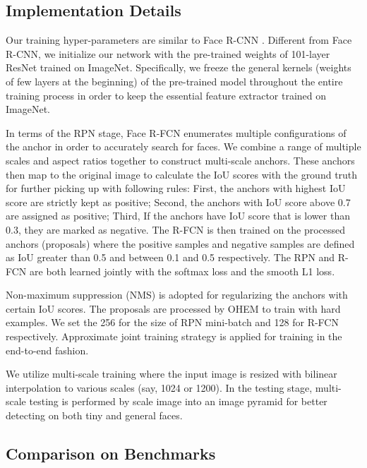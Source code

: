 \documentclass{article} \usepackage{nips13submit_e,times}
\begin{document}
\subsection{Implementation Details}
Our training hyper-parameters are similar to Face R-CNN \cite{facercnn}. Different from Face R-CNN, we initialize our network with the pre-trained weights of 101-layer ResNet trained on ImageNet. Specifically, we freeze the general kernels (weights of few layers at the beginning) of the pre-trained model throughout the entire training process in order to keep the essential feature extractor trained on ImageNet. 

In terms of the RPN stage, Face R-FCN enumerates multiple configurations of the anchor in order to accurately search for faces. We combine a range of multiple scales and aspect ratios together to construct multi-scale anchors. These anchors then map to the original image to calculate the IoU scores with the ground truth for further picking up with following rules: First, the anchors with highest IoU score are strictly kept as positive; Second, the anchors with IoU score above 0.7 are assigned as positive; Third, If the anchors have IoU score that is lower than 0.3, they are marked as negative. The R-FCN is then trained on the processed anchors (proposals) where the positive samples and negative samples are defined as IoU greater than 0.5 and between 0.1 and 0.5 respectively. The RPN and R-FCN are both learned jointly with the softmax loss and the smooth L1 loss.

Non-maximum suppression (NMS) is adopted for regularizing the anchors with certain IoU scores. The proposals are processed by OHEM to train with hard examples. We set the 256 for the size of RPN mini-batch and 128 for R-FCN respectively. Approximate joint training strategy is applied for training in the end-to-end fashion.

We utilize multi-scale training where the input image is resized with bilinear interpolation to various scales (say, 1024 or 1200). In the testing stage, multi-scale testing is performed by scale image into an image pyramid for better detecting on both tiny and general faces.










\subsection{Comparison on Benchmarks}
\end{document}
